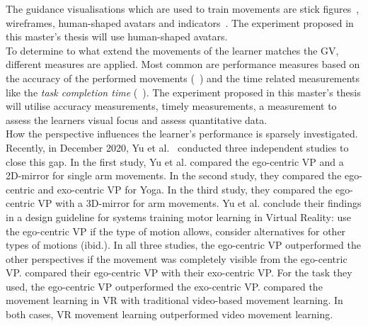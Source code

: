 The guidance visualisations which are used to train movements are stick figures~\cite{onebody,YouMove,vrdancetrainer,performancetraining}, wireframes\cite{thaichichua,mrdancetrainer}, human-shaped avatars\cite{thaichichua,vrdancetrainer,trainingphysicalskills,mythaichicoaches} and indicators~\cite{ararm,physioathome,sleevear,ghostman}. The experiment proposed in this master's thesis will use human-shaped avatars.\\

To determine to what extend the movements of the learner matches the GV, different measures are applied. Most common are performance measures based on the accuracy of the performed movements (~\cite{YouMove,thaichichua,vrdancetrainer,onebody,lightguide,physioathome}) and the time related measurements like the \textit{task completion time} (~\cite{lightguide,onebody}). The experiment proposed in this master's thesis will utilise accuracy measurements, timely measurements, a measurement to assess the learners visual focus and assess quantitative data.\\

How the perspective influences the learner's performance is sparsely investigated. Recently, in December 2020, Yu et al.~\cite{perspectivematters} conducted three independent studies to close this gap. In the first study, Yu et al. compared the ego-centric VP and a 2D-mirror for single arm movements. In the second study, they compared the ego-centric and exo-centric VP for Yoga. In the third study, they compared the ego-centric VP with a 3D-mirror for arm movements. Yu et al. conclude their findings in a design guideline for systems training motor learning in Virtual Reality: use the ego-centric VP if the type of motion allows, consider alternatives for other types of motions (ibid.). In all three studies, the ego-centric VP outperformed the other perspectives if the movement was completely visible from the ego-centric VP. \cite{onebody,lightguide} compared their ego-centric VP with their exo-centric VP. For the task they used, the ego-centric VP outperformed the exo-centric VP. \cite{YouMove,vrdancetrainer} compared the movement learning in VR with traditional video-based movement learning. In both cases, VR movement learning outperformed video movement learning.\\

